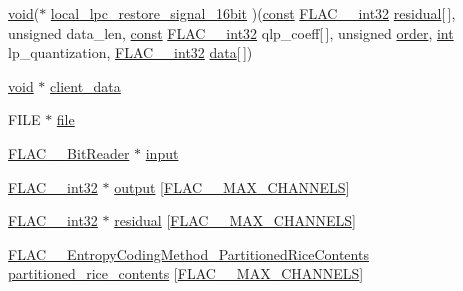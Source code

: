 \begin{DoxyCompactItemize}
\hyperlink{sound_8c_ae35f5844602719cf66324f4de2a658b3}{void}($\ast$ \hyperlink{struct_f_l_a_c_____stream_decoder_private_a1936ab718a668e75f62afc637dc81cb3}{local\+\_\+lpc\+\_\+restore\+\_\+signal\+\_\+16bit} )(\hyperlink{getopt1_8c_a2c212835823e3c54a8ab6d95c652660e}{const} \hyperlink{ordinals_8h_a33fd77bfe6d685541a0c034a75deccdc}{F\+L\+A\+C\+\_\+\+\_\+int32} \hyperlink{struct_f_l_a_c_____stream_decoder_private_a1a7ce7f0e5ca42a65eefac4e29454b97}{residual}\mbox{[}$\,$\mbox{]}, unsigned data\+\_\+len, \hyperlink{getopt1_8c_a2c212835823e3c54a8ab6d95c652660e}{const} \hyperlink{ordinals_8h_a33fd77bfe6d685541a0c034a75deccdc}{F\+L\+A\+C\+\_\+\+\_\+int32} qlp\+\_\+coeff\mbox{[}$\,$\mbox{]}, unsigned \hyperlink{rfft2d_test_m_l_8m_abc2d8236fc76d7a9d742d7eae7e459cd}{order}, \hyperlink{xmltok_8h_a5a0d4a5641ce434f1d23533f2b2e6653}{int} lp\+\_\+quantization, \hyperlink{ordinals_8h_a33fd77bfe6d685541a0c034a75deccdc}{F\+L\+A\+C\+\_\+\+\_\+int32} \hyperlink{lib_2expat_8h_ac39e72a1de1cb50dbdc54b08d0432a24}{data}\mbox{[}$\,$\mbox{]})
\item 
\hyperlink{sound_8c_ae35f5844602719cf66324f4de2a658b3}{void} $\ast$ \hyperlink{struct_f_l_a_c_____stream_decoder_private_ab0d630682e7baf3be7937bd7354a598e}{client\+\_\+data}
\item 
F\+I\+LE $\ast$ \hyperlink{struct_f_l_a_c_____stream_decoder_private_a9a740ff26d94d14540d94e21e14a7cf6}{file}
\item 
\hyperlink{struct_f_l_a_c_____bit_reader}{F\+L\+A\+C\+\_\+\+\_\+\+Bit\+Reader} $\ast$ \hyperlink{struct_f_l_a_c_____stream_decoder_private_a40ead9252a794c6549f78cfd52ffb536}{input}
\item 
\hyperlink{ordinals_8h_a33fd77bfe6d685541a0c034a75deccdc}{F\+L\+A\+C\+\_\+\+\_\+int32} $\ast$ \hyperlink{struct_f_l_a_c_____stream_decoder_private_a20c94be829f55532d695eb83e94c8cb2}{output} \mbox{[}\hyperlink{group__flac__format_ga488aa5678a58d08f984f5d39185b763d}{F\+L\+A\+C\+\_\+\+\_\+\+M\+A\+X\+\_\+\+C\+H\+A\+N\+N\+E\+LS}\mbox{]}
\item 
\hyperlink{ordinals_8h_a33fd77bfe6d685541a0c034a75deccdc}{F\+L\+A\+C\+\_\+\+\_\+int32} $\ast$ \hyperlink{struct_f_l_a_c_____stream_decoder_private_a1a7ce7f0e5ca42a65eefac4e29454b97}{residual} \mbox{[}\hyperlink{group__flac__format_ga488aa5678a58d08f984f5d39185b763d}{F\+L\+A\+C\+\_\+\+\_\+\+M\+A\+X\+\_\+\+C\+H\+A\+N\+N\+E\+LS}\mbox{]}
\item 
\hyperlink{struct_f_l_a_c_____entropy_coding_method___partitioned_rice_contents}{F\+L\+A\+C\+\_\+\+\_\+\+Entropy\+Coding\+Method\+\_\+\+Partitioned\+Rice\+Contents} \hyperlink{struct_f_l_a_c_____stream_decoder_private_a6d189cbd7ef0d5393a56d83a2192fa45}{partitioned\+\_\+rice\+\_\+contents} \mbox{[}\hyperlink{group__flac__format_ga488aa5678a58d08f984f5d39185b763d}{F\+L\+A\+C\+\_\+\+\_\+\+M\+A\+X\+\_\+\+C\+H\+A\+N\+N\+E\+LS}\mbox{]}

\end{DoxyCompactItemize}
